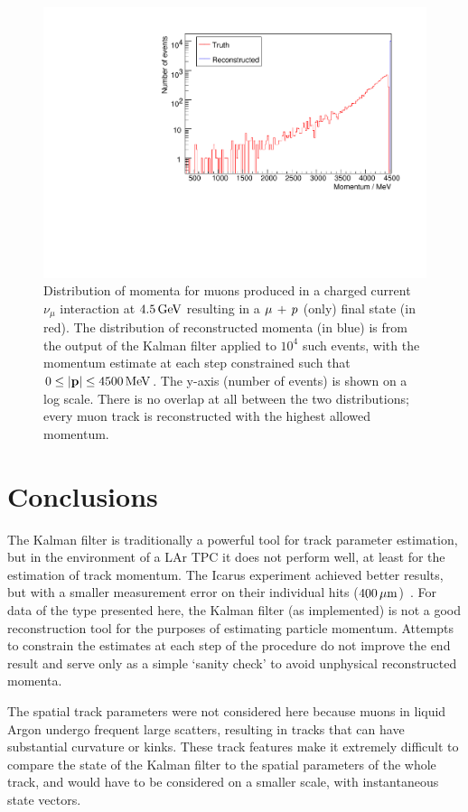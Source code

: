 \begin{figure}
    \centering
    \includegraphics[angle=-90,width=\textwidth]{chapters/trackfitting_images/kalman-ccqe-high-constrained}
    \caption[True and reconstructed muon momentum distributions at $4.5\GeV$ (constrained)]{\label{fig:kalman-constrained-ccqe-high}Distribution of momenta for muons produced in a charged current $\nu_\mu$ interaction at $4.5\GeV$ resulting in a $\mu\,+\,p$ (only) final state (in red). The distribution of reconstructed momenta (in blue) is from the output of the Kalman filter applied to $10^4$ such events, with the momentum estimate at each step constrained such that $0 \le |\mathbf{p}| \le 4500\,\mathrm{MeV}$. The y-axis (number of events) is shown on a log scale. There is no overlap at all between the two distributions; every muon track is reconstructed with the highest allowed momentum.}
\end{figure}

\clearpage
\section{Conclusions}
The Kalman filter is traditionally a powerful tool for track parameter estimation, but in the environment of a \ac{LAr TPC} it does not perform well, at least for the estimation of track momentum. The Icarus experiment achieved better results, but with a smaller measurement error on their individual hits ($400\,\mu\mathrm{m}$)~\citep{Ankowski2006}. For data of the type presented here, the Kalman filter (as implemented) is not a good reconstruction tool for the purposes of estimating particle momentum. Attempts to constrain the estimates at each step of the procedure do not improve the end result and serve only as a simple `sanity check' to avoid unphysical reconstructed momenta.

The spatial track parameters were not considered here because muons in liquid Argon undergo frequent large scatters, resulting in tracks that can have substantial curvature or kinks. These track features make it extremely difficult to compare the state of the Kalman filter to the spatial parameters of the whole track, and would have to be considered on a smaller scale, with instantaneous state vectors.
